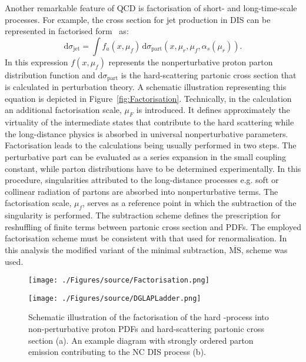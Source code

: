 Another remarkable feature of QCD is factorisation of short- and long-time-scale processes. For example, the cross section for jet production in DIS can be represented in factorised form~\cite{Collins:1989gx} as:
\begin{equation}
 \mathrm{d}\sigma_{\mathrm{jet}} = \int{f_a\left(x,\mu_f\right)}\, \mathrm{d}\sigma_{\mathrm{part}}\left(x,\mu_r, \mu_f, \alpha_s\left(\mu_r\right) \right).
\label{eq:disfactorisation}
\end{equation} 
In this expression $f\left(x,\mu_f\right)$ represents the nonperturbative proton parton distribution function and $\mathrm{d}\sigma_{\mathrm{part}}$ is the hard-scattering partonic cross section that is calculated in perturbation theory. A schematic illustration representing this equation is depicted in Figure~\ref{fig:Factorisation}. Technically, in the calculation an additional factorisation scale, $\mu_F$ is introduced. It defines approximately the virtuality of the intermediate states that contribute to the hard scattering while the long-distance physics is absorbed in universal nonperturbative parameters. Factorisation leads to the calculations being usually performed in two steps. The perturbative part can be evaluated as a series expansion in the small coupling constant, while parton distributions have to be determined experimentally. In this procedure, singularities attributed to the long-distance processes e.g. soft or collinear radiation of partons are absorbed into nonperturbative terms. The factorisation scale, $\mu_f$, serves as a reference point in which the subtraction of the singularity is performed. The subtraction scheme defines the prescription for reshuffling of finite terms between partonic cross section and PDFs. The employed factorisation scheme must be consistent with that used for renormalisation. In this analysis the modified variant of the minimal subtraction, $\overline{\mathrm{MS}}$, scheme was used.
\begin{figure}[t]
	\centering
	\begin{subfloat}[]{
		\texttt{[image: ./Figures/source/Factorisation.png]}
		\label{fig:Factorisation}
	 }%
	\end{subfloat}
	\begin{subfloat}[]{
		\texttt{[image: ./Figures/source/DGLAPLadder.png]}
		\label{fig:DGLAPLadder}
	}%
	\end{subfloat}
	\caption{Schematic illustration of the factorisation of the hard \ep-process into non-perturbative proton PDFs and hard-scattering partonic cross section (a). An example diagram with strongly ordered parton emission contributing to the NC DIS process (b).}
	\label{fig:factorisationdglapladder}
\end{figure}
